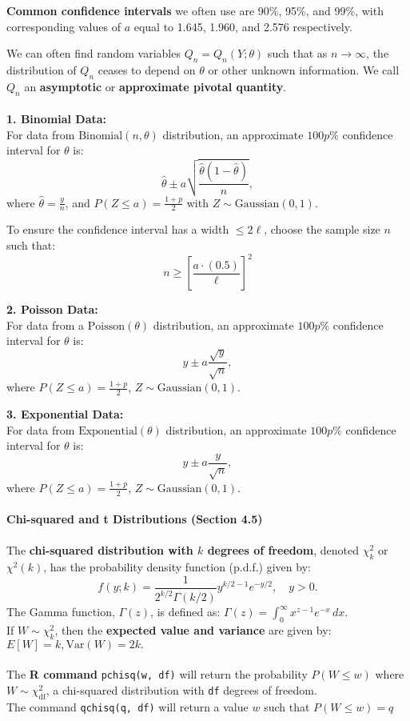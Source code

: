 \documentclass[a4paper,12pt]{article}
\begin{document}
\textbf{Common confidence intervals} we often use are 90\%, 95\%, and 99\%, with corresponding values of $a$ equal to 1.645, 1.960, and 2.576 respectively.

\newpage
We can often find random variables $Q_n = Q_n(Y; \theta)$ such that as $n \to \infty$, the distribution of $Q_n$ ceases to depend on $\theta$ or other unknown information. We call $Q_n$ an \textbf{asymptotic} or \textbf{approximate pivotal quantity}.
\\
\\\textbf{1. Binomial Data:} \\
For data from $\text{Binomial}(n, \theta)$ distribution, an approximate $100p\%$ confidence interval for $\theta$ is:
\[
\hat{\theta} \pm a \sqrt{\frac{\hat{\theta}(1-\hat{\theta})}{n}},
\]
where $\hat{\theta} = \frac{y}{n}$, and $P(Z \leq a) = \frac{1+p}{2}$ with $Z \sim \text{Gaussian}(0, 1)$.

To ensure the confidence interval has a width $\leq 2\ell$, choose the sample size $n$ such that:
\[
n \geq \left[\frac{a \cdot (0.5)}{\ell}\right]^2
\]

\textbf{2. Poisson Data:} \\
For data from a $\text{Poisson}(\theta)$ distribution, an approximate $100p\%$ confidence interval for $\theta$ is:
\[
y \pm a \frac{\sqrt{y}}{\sqrt{n}},
\]
where $P(Z \leq a) = \frac{1+p}{2}$, $Z \sim \text{Gaussian}(0, 1)$.

\textbf{3. Exponential Data:} \\
For data from $\text{Exponential}(\theta)$ distribution, an approximate $100p\%$ confidence interval for $\theta$ is:
\[
y \pm a \frac{y}{\sqrt{n}},
\]
where $P(Z \leq a) = \frac{1+p}{2}$, $Z \sim \text{Gaussian}(0, 1)$.
\\
\\\textbf{Chi-squared and t Distributions (Section 4.5)}
\\
\\The \textbf{chi-squared distribution with $k$ degrees of freedom}, denoted $\chi^2_k$ or $\chi^2(k)$, has the probability density function (p.d.f.) given by:
\[
f(y; k) = \frac{1}{2^{k/2} \Gamma(k/2)} y^{k/2 - 1} e^{-y/2}, \quad y > 0.
\]
The Gamma function, $\Gamma(z)$, is defined as:
$
\Gamma(z) = \int_{0}^{\infty} x^{z-1} e^{-x} \, dx.
$
\\ If \( W \sim \chi^2_k \), then the \textbf{expected value and variance} are given by:
$ E[W] = k, \text{Var}(W) = 2k.$
\\
\\ The \textbf{R command} \texttt{pchisq(w, df)} will return the probability $P(W \leq w)$
where \( W \sim \chi^2_{\text{df}} \), a chi-squared distribution with \texttt{df} degrees of freedom. 
\\ The command \texttt{qchisq(q, df)} will return a value \( w \) such that $P(W \leq w) = q$
\end{document}
